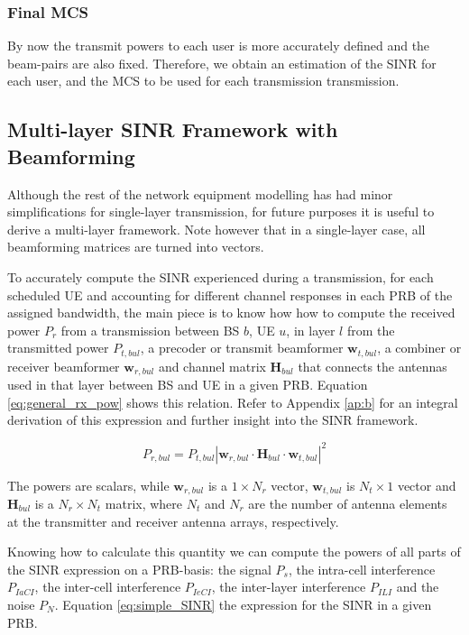\subsubsection*{Final MCS}

By now the transmit powers to each user is more accurately defined and the beam-pairs are also fixed. Therefore, we obtain an estimation of the SINR for each user, and the MCS to be used for each transmission transmission.


\subsection{Multi-layer SINR Framework with Beamforming}

Although the rest of the network equipment modelling has had minor simplifications for single-layer transmission, for future purposes it is useful to derive a multi-layer framework. Note however that in a single-layer case, all beamforming matrices are turned into vectors.

To accurately compute the SINR experienced during a transmission, for each scheduled \acs{UE} and accounting for different channel responses in each \acs{PRB} of the assigned bandwidth, the main piece is to know how how to compute the received power $P_r$ from a transmission between BS $b$, UE $u$, in layer $l$ from the transmitted power $P_{t, bul}$, a precoder or transmit beamformer $\bm{w}_{t, bul}$, a combiner or receiver beamformer $\bm{w}_{r, bul}$ and channel matrix $\bm{H}_{bul}$ that connects the antennas used in that layer between BS and UE in a given PRB. Equation \eqref{eq:general_rx_pow} shows this relation. Refer to Appendix \ref{ap:b} for an integral derivation of this expression and further insight into the SINR framework.

\begin{equation} \label{eq:general_rx_pow}
    P_{r, bul} = P_{t, bul} \left| \bm{w}_{r, bul} \cdot \bm{H}_{bul} \cdot \bm{w}_{t, bul} \right|^2        
\end{equation}

The powers are scalars, while $\bm{w}_{r, bul}$ is a $1 \times N_r$ vector, $\bm{w}_{t, bul}$ is $N_t \times 1$ vector and $\bm{H}_{bul}$ is a $N_r \times N_t$ matrix, where $N_t$ and $N_r$ are the number of antenna elements at the transmitter and receiver antenna arrays, respectively.

Knowing how to calculate this quantity we can compute the powers of all parts of the SINR expression on a PRB-basis: the signal $P_s$, the intra-cell interference $P_{IaCI}$, the inter-cell interference $P_{IeCI}$, the inter-layer interference $P_{ILI}$ and the noise $P_N$. Equation \eqref{eq:simple_SINR} the expression for the SINR in a given PRB.


